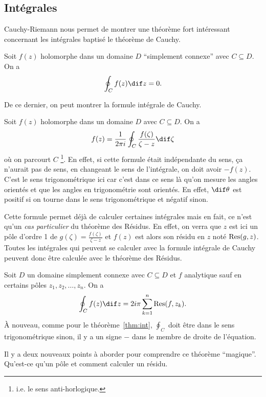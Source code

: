 \subsection{Intégrales}
Cauchy-Riemann nous permet de montrer
une théorème fort intéressant concernant les intégrales baptisé le
théorème de Cauchy.
\begin{mytheo}
  Soit $f(z)$ holomorphe dans un domaine $D$ ``simplement connexe''
  avec $C \subseteq D$.
  On a
  \[ \oint_C f(z) \dif z = 0. \]
\end{mytheo}
De ce dernier, on peut montrer la formule intégrale de Cauchy.
\begin{mytheo}
  \label{thm:int}
  Soit $f(z)$ holomorphe dans un domaine $D$
  avec $C \subseteq D$. %
  On a
  \[ f(z) = \frac{1}{2\pi i}\oint_C
  \frac{f(\zeta)}{\zeta-z} \dif \zeta \]
  où on parcourt $C$ 
  \footnote{i.e. le sens anti-horlogique.}.
  En effet, si cette formule était indépendante du sens,
  ça n'aurait pas de sens,
  en changeant le sens de l'intégrale,
  on doit avoir $-f(z)$.
  C'est le sens trigonométrique ici car c'est dans ce sens
  là qu'on mesure les angles orientés et que les angles en trigonométrie
  sont orientés.
  En effet, $\dif \theta$ est positif si on tourne dans le sens
  trigonométrique et négatif sinon.
\end{mytheo}

Cette formule permet déjà de calculer certaines intégrales mais
en fait, ce n'est qu'un \emph{cas particulier} du théorème des Résidus.
En effet, on verra que $z$ est ici un pôle d'ordre 1 de
$g(\zeta)=\frac{f(\zeta)}{\zeta-z}$
et $f(z)$ est alors son résidu en $z$ noté
$\operatorname{Res}(g,z)$.
Toutes les intégrales qui peuvent se calculer avec la formule
intégrale de Cauchy peuvent donc être calculée avec le théorème
des Résidus.

\begin{mytheo}
  Soit $D$ un domaine simplement connexe avec
  $C \subseteq D$ et $f$ analytique
  sauf en certains pôles $z_1, z_2, \ldots, z_n$.
  On a
  \[ \oint_C f(z) \dif z = 2i\pi\sum_{k=1}^n \res(f, z_k). \]
  À nouveau,
  comme pour le théorème~\ref{thm:int},
  $\oint_C$ doit être dans le sens trigonométrique sinon,
  il y a un signe $-$ dans le membre de droite de l'équation.
\end{mytheo}

Il y a deux nouveaux points à aborder pour comprendre ce théorème
``magique''.
Qu'est-ce qu'un pôle et comment calculer un résidu.

